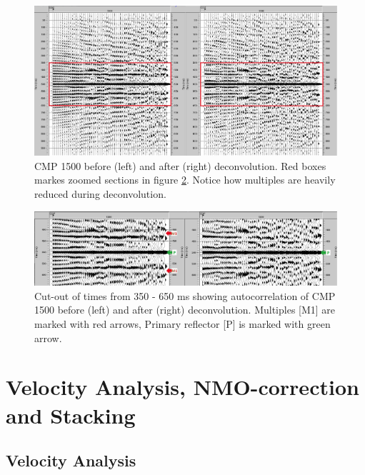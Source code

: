 \documentclass[10pt,a4paper]{article}
\begin{document}
\begin{figure}[H]
\includegraphics[width=\textwidth]{fig19.jpg}
\caption{CMP 1500 before (left) and after (right) deconvolution. Red boxes markes zoomed sections in figure \ref{fig20}. Notice how multiples are heavily reduced during deconvolution.}
\label{fig19}
\end{figure}

\begin{figure}[H]
\includegraphics[width=\textwidth]{fig20.jpg}
\caption{Cut-out of times from 350 - 650 ms showing autocorrelation of CMP 1500 before (left) and after (right) deconvolution. Multiples [M1] are marked with red arrows, Primary reflector [P] is marked with green arrow.}
\label{fig20}
\end{figure}


\section{Velocity Analysis, NMO-correction and Stacking}

\subsection{Velocity Analysis}
\end{document}

